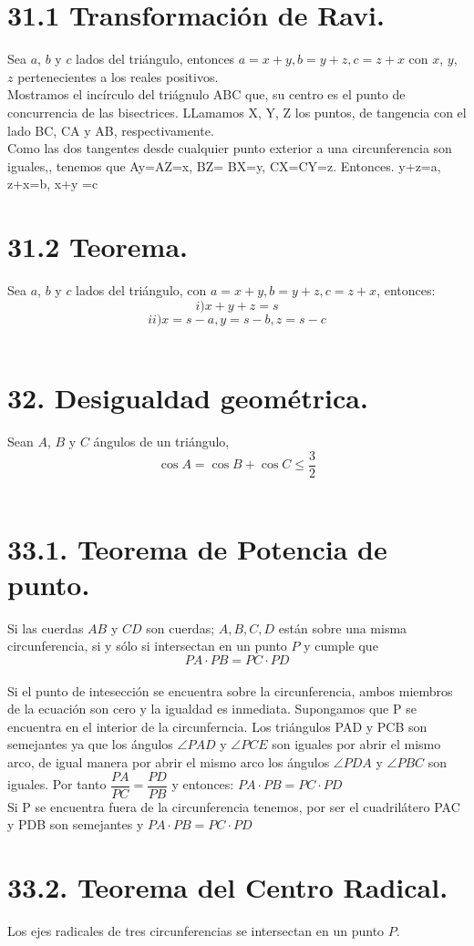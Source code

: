 \documentclass[12pt,a4paper, oneside]{book}
\begin{document}
\section{31.1 Transformación de Ravi.}
Sea $a$, $b$ y $c$ lados del triángulo, entonces $a=x+y, b=y+z, c=z+x$ con $x$, $y$, $z$ pertenecientes a los reales positivos.
\\
Mostramos el incírculo del triágnulo ABC que, su centro es el punto de concurrencia de las bisectrices. LLamamos X, Y, Z los puntos,  de tangencia con el lado BC, CA y AB, respectivamente.
\\ Como las dos tangentes desde cualquier punto exterior a una circunferencia son iguales,, tenemos que Ay=AZ=x, BZ= BX=y, CX=CY=z. Entonces. y+z=a, z+x=b,  x+y =c
\section{31.2 Teorema.}
Sea $a$, $b$ y $c$ lados del triángulo, con $a=x+y, b=y+z, c=z+x$, entonces:
$$i) x+y+z=s$$
$$ii) x=s-a , y=s-b, z=s-c$$
\\
\section{32. Desigualdad geométrica.}
Sean $A$, $B$ y $C$ ángulos de un triángulo, $$\cos A =\cos B +\cos C \leq \dfrac{3}{2}$$ 
\\

\section{33.1. Teorema de Potencia de punto.}
Si las cuerdas $AB$ y $CD$ son cuerdas; $A, B, C, D$ están sobre una misma circunferencia, si y sólo si intersectan en un punto $P$ y cumple que $$PA \cdot PB = PC \cdot PD$$
\\
Si el punto de intesección se encuentra sobre la circunferencia, ambos miembros de la ecuación son cero y la igualdad es inmediata. Supongamos que P se encuentra en el interior de la circunferncia. Los triángulos PAD y PCB son semejantes ya que los ángulos $\angle PAD$ y $\angle PCE$ son iguales por abrir el mismo arco, de igual manera por abrir el mismo arco los ángulos $\angle PDA$ y $\angle PBC$ son iguales. Por tanto $\dfrac{PA}{PC}=\dfrac{PD}{PB}$ y entonces: $PA \cdot PB = PC \cdot PD$
\\Si P se encuentra fuera de la circunferencia tenemos, por ser el cuadrilátero PAC y PDB son semejantes y $PA \cdot PB= PC \cdot PD$
\section{33.2. Teorema del Centro Radical.}
Los ejes radicales de tres circunferencias se intersectan en un punto $P$.
\end{document}
